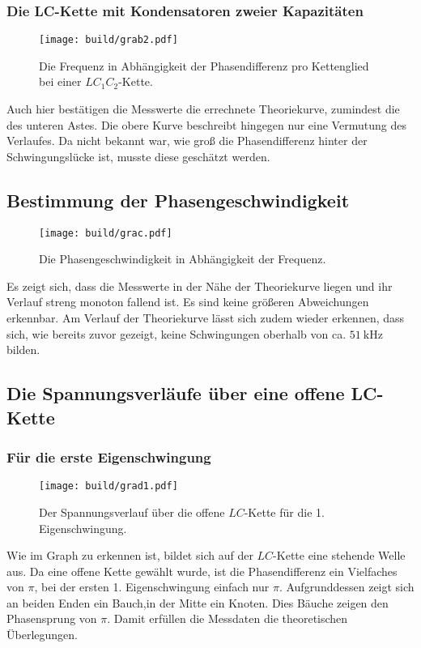 \subsubsection{Die LC-Kette mit Kondensatoren zweier Kapazitäten}
\begin{figure}[H]
	\centering
	\caption{Die Frequenz in Abhängigkeit der Phasendifferenz pro Kettenglied bei einer $LC_1C_2$-Kette.}
	\texttt{[image: build/grab2.pdf]}
	\label{fig:grab2}
\end{figure}

Auch hier bestätigen die Messwerte die errechnete Theoriekurve,
 zumindest die des unteren Astes. Die obere Kurve beschreibt hingegen nur eine Vermutung des Verlaufes. Da
  nicht bekannt war, wie groß die Phasendifferenz hinter der Schwingungslücke ist,
	musste diese geschätzt werden.


\subsection{Bestimmung der Phasengeschwindigkeit}

\begin{figure}[H]
	\centering
	\caption{Die Phasengeschwindigkeit in Abhängigkeit der Frequenz.}
	\texttt{[image: build/grac.pdf]}
	\label{fig:grac}
\end{figure}

Es zeigt sich, dass die Messwerte in der Nähe der Theoriekurve liegen und ihr Verlauf
 streng monoton fallend ist. Es sind keine größeren Abweichungen erkennbar. Am
  Verlauf der Theoriekurve lässt sich zudem wieder erkennen, dass sich, wie bereits zuvor
 gezeigt, keine Schwingungen oberhalb von ca. $\SI{51}{\kilo\hertz}$ bilden.

\subsection{Die Spannungsverläufe über eine offene LC-Kette}
\subsubsection{Für die erste Eigenschwingung}
\begin{figure}[H]
	\centering
	\caption{Der Spannungsverlauf über die offene $LC$-Kette für die 1. Eigenschwingung.}
	\texttt{[image: build/grad1.pdf]}
	\label{fig:grad1}
\end{figure}
Wie im Graph zu erkennen ist, bildet sich auf der $LC$-Kette eine stehende Welle aus.
 Da eine offene Kette gewählt wurde, ist die Phasendifferenz ein Vielfaches
  von $\pi$, bei der ersten 1. Eigenschwingung einfach nur $\pi$. Aufgrunddessen zeigt
 sich an beiden Enden ein Bauch,in der Mitte ein Knoten. Dies Bäuche zeigen
  den Phasensprung von $\pi$. Damit erfüllen die Messdaten die
theoretischen Überlegungen.
